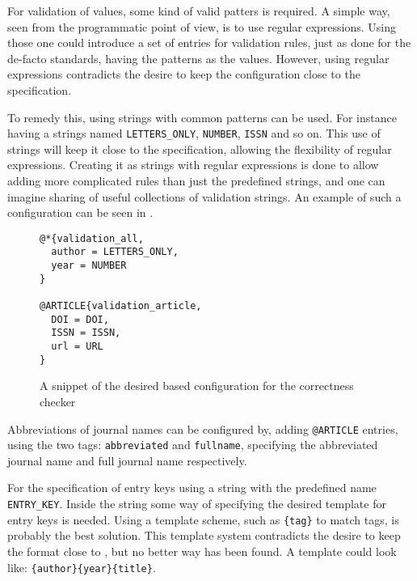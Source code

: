 For validation of values, some kind of valid patters is required.  A
simple way, seen from the programmatic point of view, is to use
regular expressions.  Using those one could introduce a set of entries
for validation rules, just as done for the de-facto standards, having
the patterns as the values.  However, using regular expressions
contradicts the desire to keep the configuration close to the
{\bibtex} specification.

To remedy this, using strings with common patterns can be used.  For
instance having a strings named \texttt{LETTERS\_ONLY},
\texttt{NUMBER}, \texttt{ISSN} and so on.  This use of strings will
keep it close to the {\bibtex} specification, allowing the flexibility
of regular expressions.  Creating it as strings with regular
expressions is done to allow adding more complicated rules than just
the predefined strings, and one can imagine sharing of useful
collections of validation strings.  An example of such a configuration
can be seen in .

\begin{figure}
  \centering
\begin{verbatim}
@*{validation_all,
  author = LETTERS_ONLY,
  year = NUMBER
}

@ARTICLE{validation_article,
  DOI = DOI,
  ISSN = ISSN,
  url = URL
}
\end{verbatim}
  \caption{A snippet of the desired {\bibtex} based configuration for
    the correctness checker}
  \label{fig:analyzing_validation_config}
\end{figure}

Abbreviations of journal names can be configured by, adding
\texttt{@ARTICLE} entries, using the two tags: \texttt{abbreviated}
and \texttt{fullname}, specifying the abbreviated journal name and
full journal name respectively.


For the specification of entry keys using a {\bibtex} string with the
predefined name \texttt{ENTRY\_KEY}.  Inside the string some way of
specifying the desired template for entry keys is needed.  Using a
template scheme, such as \texttt{\{tag\}} to match tags, is probably
the best solution.  This template system contradicts the desire to
keep the format close to {\bibtex}, but no better way has been found.
A template could look like: \texttt{\{author\}\{year\}\{title\}}.

